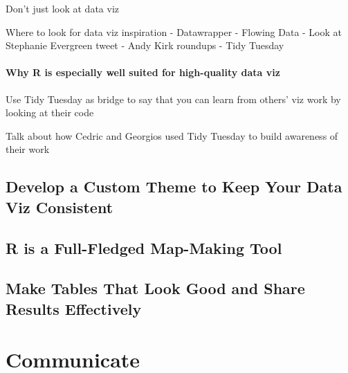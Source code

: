 \documentclass[
]{book}
\begin{document}
Don't just look at data viz

Where to look for data viz inspiration
- Datawrapper
- Flowing Data
- Look at Stephanie Evergreen tweet
- Andy Kirk roundups
- Tidy Tuesday

\hypertarget{why-r-is-especially-well-suited-for-high-quality-data-viz}{%
\subsection*{Why R is especially well suited for high-quality data viz}\label{why-r-is-especially-well-suited-for-high-quality-data-viz}}

Use Tidy Tuesday as bridge to say that you can learn from others' viz work by looking at their code

Talk about how Cedric and Georgios used Tidy Tuesday to build awareness of their work

\hypertarget{develop-a-custom-theme-to-keep-your-data-viz-consistent}{%
\chapter*{Develop a Custom Theme to Keep Your Data Viz Consistent}\label{develop-a-custom-theme-to-keep-your-data-viz-consistent}}

\hypertarget{r-is-a-full-fledged-map-making-tool}{%
\chapter*{R is a Full-Fledged Map-Making Tool}\label{r-is-a-full-fledged-map-making-tool}}

\hypertarget{make-tables-that-look-good-and-share-results-effectively}{%
\chapter*{Make Tables That Look Good and Share Results Effectively}\label{make-tables-that-look-good-and-share-results-effectively}}

\hypertarget{part-communicate}{%
\part*{Communicate}\label{part-communicate}}
\end{document}
